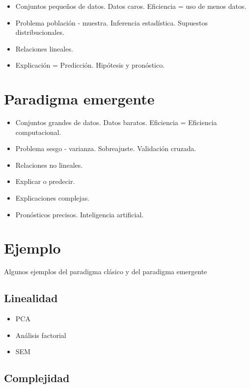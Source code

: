 \documentclass[
  letterpaper,
  DIV=11,
  numbers=noendperiod]{scrreprt}
\begin{document}
\begin{itemize}
\item
  Conjuntos pequeños de datos. Datos caros. Eficiencia = uso de menos
  datos.
\item
  Problema población - muestra. Inferencia estadística. Supuestos
  distribucionales.
\item
  Relaciones lineales.
\item
  Explicación = Predicción. Hipótesis y pronóstico.
\end{itemize}

\section{Paradigma emergente}\label{paradigma-emergente-1}

\begin{itemize}
\item
  Conjuntos grandes de datos. Datos baratos. Eficiencia = Eficiencia
  computacional.
\item
  Problema sesgo - varianza. Sobreajuste. Validación cruzada.
\item
  Relaciones no lineales.
\item
  Explicar o predecir.
\item
  Explicaciones complejas.
\item
  Pronósticos precisos. Inteligencia artificial.
\end{itemize}

\section{Ejemplo}\label{ejemplo-3}

Algunos ejemplos del paradigma clásico y del paradigma emergente

\subsection{Linealidad}\label{linealidad}

\begin{itemize}
\item
  PCA
\item
  Análisis factorial
\item
  SEM
\end{itemize}

\subsection{Complejidad}\label{complejidad}
\end{document}
